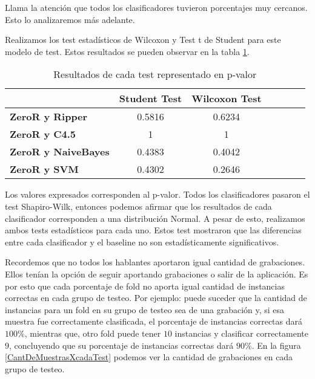 Llama la atención que todos los clasificadores tuvieron porcentajes muy cercanos. Esto lo analizaremos más adelante. 

Realizamos los test estadísticos de Wilcoxon y Test t de Student para este modelo de test. Estos resultados se pueden observar en la tabla  \ref{HPTDT_res_tests_wilcoxon_student}.

\begin{table}[H]
	\centering
	\begin{tabular}{|l|c|c|c|c|c|c|}
		\hline
		\textbf{}  & \textbf{Student Test} & \textbf{Wilcoxon Test} \\ \hline
		\textbf{ZeroR y Ripper}  & 0.5816 & 0.6234 \\ \hline
		\textbf{ZeroR y C4.5}  & 1 & 1 \\ \hline
		\textbf{ZeroR y NaiveBayes}  & 0.4383 & 0.4042 \\ \hline
		\textbf{ZeroR y SVM}  & 0.4302 & 0.2646 \\ \hline
	\end{tabular}
	\caption{Resultados de cada test representado en p-valor}
	\label{HPTDT_res_tests_wilcoxon_student}
\end{table}

Los valores expresados corresponden al p-valor. Todos los clasificadores pasaron el test Shapiro-Wilk, entonces podemos afirmar que los resultados de cada clasificador corresponden a una distribución Normal. A pesar de esto, realizamos ambos tests estadísticos para cada uno. Estos test mostraron que las diferencias entre cada clasificador y el baseline no son estadísticamente significativos.

Recordemos que no todos los hablantes aportaron igual cantidad de grabaciones. Ellos tenían la opción de seguir aportando grabaciones o salir de la aplicación. Es por esto que cada porcentaje de fold no aporta igual cantidad de instancias correctas en cada grupo de testeo. Por ejemplo: puede suceder que la cantidad de instancias para un fold en su grupo de testeo sea de una grabación y, si esa muestra fue correctamente clasificada, el porcentaje de instancias correctas dará $100\%$, mientras que, otro fold puede tener $10$ instancias y clasificar correctamente $9$, concluyendo que su porcentaje de instancias correctas dará $90\%$. En la figura \ref{CantDeMuestrasXcadaTest} podemos ver la cantidad de grabaciones en cada grupo de testeo. 

